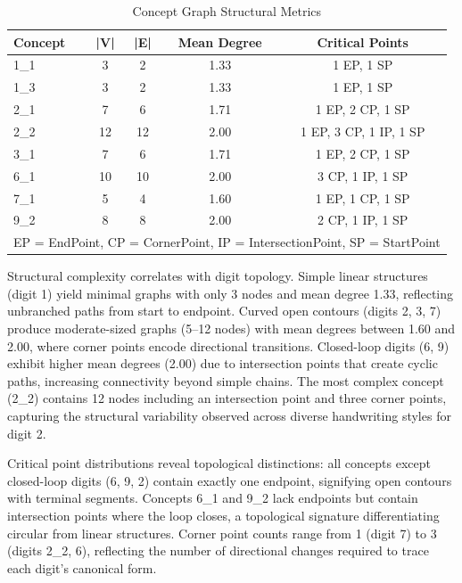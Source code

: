 \documentclass[runningheads]{llncs}
\begin{document}
\begin{table}[!t]
\caption{Concept Graph Structural Metrics}
\label{tab:concept_metrics}
\centering
\begin{tabular}{lcccc}
\hline
\textbf{Concept} & \textbf{|V|} & \textbf{|E|} & \textbf{Mean Degree} & \textbf{Critical Points} \\
\hline
1\_1 & 3 & 2 & 1.33 & 1 EP, 1 SP \\
1\_3 & 3 & 2 & 1.33 & 1 EP, 1 SP \\
2\_1 & 7 & 6 & 1.71 & 1 EP, 2 CP, 1 SP \\
2\_2 & 12 & 12 & 2.00 & 1 EP, 3 CP, 1 IP, 1 SP \\
3\_1 & 7 & 6 & 1.71 & 1 EP, 2 CP, 1 SP \\
6\_1 & 10 & 10 & 2.00 & 3 CP, 1 IP, 1 SP \\
7\_1 & 5 & 4 & 1.60 & 1 EP, 1 CP, 1 SP \\
9\_2 & 8 & 8 & 2.00 & 2 CP, 1 IP, 1 SP \\
\hline
\multicolumn{5}{l}{\footnotesize EP = EndPoint, CP = CornerPoint, IP = IntersectionPoint, SP = StartPoint}
\end{tabular}
\end{table}

Structural complexity correlates with digit topology. Simple linear structures (digit 1) yield minimal graphs with only 3 nodes and mean degree 1.33, reflecting unbranched paths from start to endpoint. Curved open contours (digits 2, 3, 7) produce moderate-sized graphs (5--12 nodes) with mean degrees between 1.60 and 2.00, where corner points encode directional transitions. Closed-loop digits (6, 9) exhibit higher mean degrees (2.00) due to intersection points that create cyclic paths, increasing connectivity beyond simple chains. The most complex concept (2\_2) contains 12 nodes including an intersection point and three corner points, capturing the structural variability observed across diverse handwriting styles for digit 2.

Critical point distributions reveal topological distinctions: all concepts except closed-loop digits (6, 9, 2) contain exactly one endpoint, signifying open contours with terminal segments. Concepts 6\_1 and 9\_2 lack endpoints but contain intersection points where the loop closes, a topological signature differentiating circular from linear structures. Corner point counts range from 1 (digit 7) to 3 (digits 2\_2, 6), reflecting the number of directional changes required to trace each digit's canonical form.
\end{document}
